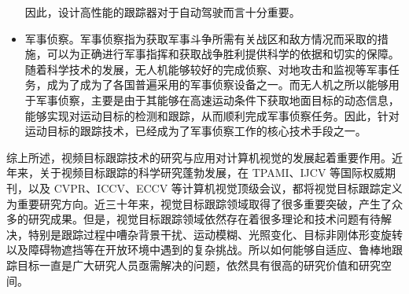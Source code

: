 \begin{itemize}
因此，设计高性能的跟踪器对于自动驾驶而言十分重要。%
\item 军事侦察。军事侦察指为获取军事斗争所需有关战区和敌方情况而采取的措施，可以为正确进行军事指挥和获取战争胜利提供科学的依据和切实的保障。随着科学技术的发展，无人机能够较好的完成侦察、对地攻击和监视等军事任务，成为了成为了各国普遍采用的军事侦察设备之一。而无人机之所以能够用于军事侦察，主要是由于其能够在高速运动条件下获取地面目标的动态信息，能够实现对运动目标的检测和跟踪，从而顺利完成军事侦察任务。因此，针对运动目标的跟踪技术，已经成为了军事侦察工作的核心技术手段之一。
\end{itemize}

综上所述，视频目标跟踪技术的研究与应用对计算机视觉的发展起着重要作用。近年来，关于视频目标跟踪的科学研究蓬勃发展，在 TPAMI、IJCV 等国际权威期刊，以及 CVPR、ICCV、ECCV 等计算机视觉顶级会议，都将视觉目标跟踪定义为重要研究方向。近三十年来，视觉目标跟踪领域取得了很多重要突破，产生了众多的研究成果。但是，视觉目标跟踪领域依然存在着很多理论和技术问题有待解决，特别是跟踪过程中嘈杂背景干扰、运动模糊、光照变化、目标非刚体形变旋转以及障碍物遮挡等在开放环境中遇到的复杂挑战。所以如何能够自适应、鲁棒地跟踪目标一直是广大研究人员亟需解决的问题，依然具有很高的研究价值和研究空间。
\iffalse
\subsection{计算机视觉}
计算机视觉是计算机科学与模式识别领域的一项重要的科学研究任务。该任务的目的是使用计算机对数字图像、视频进行智能地自动化分析，实现对数字图像/视频内容的智能感知和理解。如对对图像/视频中目标的识别、检测、跟踪、分割等。视频目标跟踪便是计算机视觉中的一项重要研究课题。视频目标跟踪指对视频中出现的任一物体进行跟踪：首先用一个矩形框在视频的第一帧中框住感兴趣的物体，视频目标跟踪算法需要准确高效地在后续每一帧中都预测一个矩形框，用于表示感兴趣物体的位置、尺寸和长宽比。
\fi

